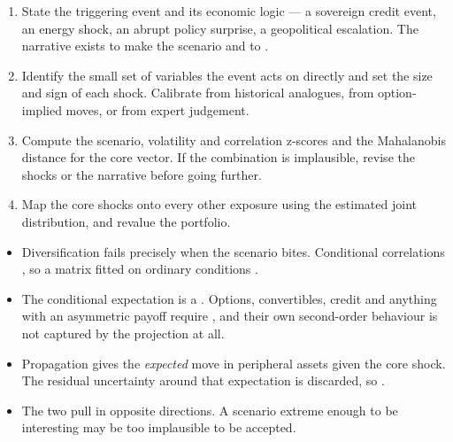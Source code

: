 \begin{enumerate}
\item {} State the triggering event and its economic
logic --- a sovereign credit event, an energy shock, an abrupt policy surprise, a
geopolitical escalation. The narrative exists to make the scenario
 and to .
\item {} Identify the small set of variables the event
acts on directly and set the size and sign of each shock. Calibrate from
historical analogues, from option-implied moves, or from expert judgement.
\item {} Compute the scenario, volatility and correlation
z-scores and the Mahalanobis distance for the core vector. If the combination is
implausible, revise the shocks or the narrative before going further. 
\item {} Map the core shocks onto every other exposure using the
estimated joint distribution, and revalue the portfolio.
\end{enumerate}


\begin{itemize}
\item {} Diversification fails
precisely when the scenario bites. Conditional correlations , so a matrix fitted on ordinary conditions .
\item {} The conditional expectation is a
. Options, convertibles, credit and anything with an
asymmetric payoff require , and their own second-order
behaviour is not captured by the projection at all.
\item {} Propagation gives the
\emph{expected} move in peripheral assets given the core shock. The residual
uncertainty around that expectation is discarded, so .
\item {} The two pull in opposite directions. A
scenario extreme enough to be interesting may be too implausible to be accepted.
\end{itemize}

